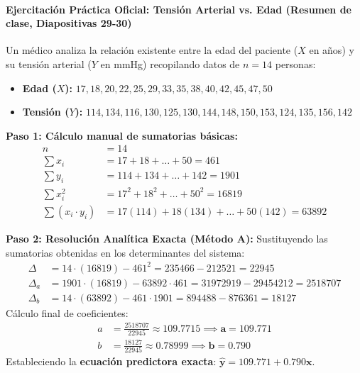 \documentclass[11pt,letterpaper]{article}
\begin{document}
\paragraph{Ejercitación Práctica Oficial: Tensión Arterial vs. Edad (Resumen de clase, Diapositivas 29-30)}
Un médico analiza la relación existente entre la edad del paciente ($X$ en años) y su tensión arterial ($Y$ en mmHg) recopilando datos de $n = 14$ personas:
\begin{itemize}
    \item \textbf{Edad ($X$):} $17, 18, 20, 22, 25, 29, 33, 35, 38, 40, 42, 45, 47, 50$
    \item \textbf{Tensión ($Y$):} $114, 134, 116, 130, 125, 130, 144, 148, 150, 153, 124, 135, 156, 142$
\end{itemize}

\textbf{Paso 1: Cálculo manual de sumatorias básicas:}
\begin{align*}
    n &= 14 \\
    \sum x_i &= 17+18+\dots+50 = 461 \\
    \sum y_i &= 114+134+\dots+142 = 1901 \\
    \sum x_i^2 &= 17^2+18^2+\dots+50^2 = 16819 \\
    \sum (x_i \cdot y_i) &= 17(114)+18(134)+\dots+50(142) = 63892
\end{align*}

\textbf{Paso 2: Resolución Analítica Exacta (Método A):}
Sustituyendo las sumatorias obtenidas en los determinantes del sistema:
\begin{align}
    \Delta &= 14 \cdot (16819) - 461^2 = 235466 - 212521 = 22945 \\
    \Delta_a &= 1901 \cdot (16819) - 63892 \cdot 461 = 31972919 - 29454212 = 2518707 \\
    \Delta_b &= 14 \cdot (63892) - 461 \cdot 1901 = 894488 - 876361 = 18127
\end{align}
Cálculo final de coeficientes:
\begin{align}
    a &= \frac{2518707}{22945} \approx 109.7715 \implies \mathbf{a = 109.771} \\
    b &= \frac{18127}{22945} \approx 0.78999 \implies \mathbf{b = 0.790}
\end{align}
Estableciendo la \textbf{ecuación predictora exacta}: $\mathbf{\hat{y} = 109.771 + 0.790x}$.
\end{document}
